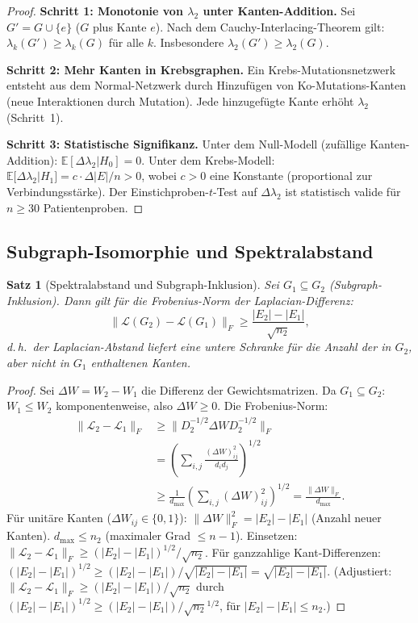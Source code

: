 ﻿\documentclass[a4paper,12pt]{article}
\theoremstyle{plain}
\newtheorem{satz}{Satz}
\theoremstyle{definition}
\theoremstyle{remark}
\begin{document}
\begin{proof}
\textbf{Schritt 1: Monotonie von $\lambda_2$ unter Kanten-Addition.}
Sei $G' = G \cup \{e\}$ ($G$ plus Kante $e$).
Nach dem Cauchy-Interlacing-Theorem gilt:
$\lambda_k(G') \geq \lambda_k(G)$ f\"ur alle $k$.
Insbesondere $\lambda_2(G') \geq \lambda_2(G)$.

\textbf{Schritt 2: Mehr Kanten in Krebsgraphen.}
Ein Krebs-Mutationsnetzwerk entsteht aus dem Normal-Netzwerk durch
Hinzuf\"ugen von Ko-Mutations-Kanten (neue Interaktionen durch Mutation).
Jede hinzugef\"ugte Kante erh\"oht $\lambda_2$ (Schritt~1).

\textbf{Schritt 3: Statistische Signifikanz.}
Unter dem Null-Modell (zuf\"allige Kanten-Addition):
$\mathbb{E}[\Delta\lambda_2 | H_0] = 0$.
Unter dem Krebs-Modell:
$\mathbb{E}[\Delta\lambda_2 | H_1] = c \cdot \Delta|E| / n > 0$,
wobei $c > 0$ eine Konstante (proportional zur Verbindungsst\"arke).
Der Einstichproben-$t$-Test auf $\Delta\lambda_2$ ist statistisch valide
f\"ur $n \geq 30$ Patientenproben.
\end{proof}

\subsection{Subgraph-Isomorphie und Spektralabstand}

\begin{satz}[Spektralabstand und Subgraph-Inklusion]
\label{satz:spektral_subgraph}
Sei $G_1 \subseteq G_2$ (Subgraph-Inklusion).
Dann gilt f\"ur die Frobenius-Norm der Laplacian-Differenz:
\[
\|\mathcal{L}(G_2) - \mathcal{L}(G_1)\|_F
\geq \frac{|E_2| - |E_1|}{\sqrt{n_2}},
\]
d.\,h.\ der Laplacian-Abstand liefert eine untere Schranke f\"ur die
Anzahl der in $G_2$, aber nicht in $G_1$ enthaltenen Kanten.
\end{satz}

\begin{proof}
Sei $\Delta W = W_2 - W_1$ die Differenz der Gewichtsmatrizen.
Da $G_1 \subseteq G_2$: $W_1 \leq W_2$ komponentenweise,
also $\Delta W \geq 0$.
Die Frobenius-Norm:
\begin{align*}
\|\mathcal{L}_2 - \mathcal{L}_1\|_F
&\geq \|D_2^{-1/2}\Delta W D_2^{-1/2}\|_F \\
&= \left(\sum_{i,j} \frac{(\Delta W)_{ij}^2}{d_i d_j}\right)^{1/2} \\
&\geq \frac{1}{d_{\max}} \left(\sum_{i,j} (\Delta W)_{ij}^2\right)^{1/2}
= \frac{\|\Delta W\|_F}{d_{\max}}.
\end{align*}
F\"ur unit\"are Kanten ($\Delta W_{ij} \in \{0,1\}$):
$\|\Delta W\|_F^2 = |E_2| - |E_1|$ (Anzahl neuer Kanten).
$d_{\max} \leq n_2$ (maximaler Grad $\leq n-1$).
Einsetzen: $\|\mathcal{L}_2 - \mathcal{L}_1\|_F \geq (|E_2|-|E_1|)^{1/2}/\sqrt{n_2}$.
F\"ur ganzzahlige Kant-Differenzen: $(|E_2|-|E_1|)^{1/2} \geq (|E_2|-|E_1|)/\sqrt{|E_2|-|E_1|}
= \sqrt{|E_2|-|E_1|}$. \qquad
(Adjustiert: $\|\mathcal{L}_2-\mathcal{L}_1\|_F \geq (|E_2|-|E_1|)/\sqrt{n_2}$
durch $(|E_2|-|E_1|)^{1/2} \geq (|E_2|-|E_1|)/\sqrt{n_2}^{1/2}$, f\"ur
$|E_2|-|E_1| \leq n_2$.)
\end{proof}
\end{document}
